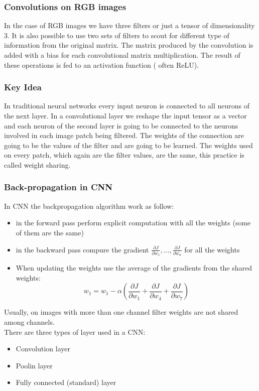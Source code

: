 \documentclass{article}
\begin{document}
\subsubsection{Convolutions on RGB images}
In the case of RGB images we have three filters or just a tensor of dimensionality 3. It is also possible to use two sets of filters to scout for different type of information from the original matrix. The matrix produced by the convolution is added with a bias for each convolutional matrix multiplication. The result of these operations is fed to an activation function ( often ReLU).
\subsubsection{Key Idea}
In traditional neural networks every input neuron is connected to all neurons of the next layer. In a convolutional layer we reshape the input tensor as a vector and each neuron of the second layer is going to be connected to the neurons involved in each image patch being filtered. The weights of the connection are going to be the values of the filter and are going to be learned. The weights used on every patch, which again are the filter values, are the same, this practice is called weight sharing. 
\subsubsection*{Back-propagation in CNN}
In CNN the backpropagation algorithm work as follow:
\begin{itemize}
    \item in the forward pass perform explicit computation with all the weights (some of them are the same)
    \item in the backward pass compure the gradient $\frac{\partial J}{\partial w_{1}}, \ldots,\frac{\partial J}{\partial w_{n}}$ for all the weights
    \item When updating the weights use the average of the gradients from the shared weights:
    \[ 
        w_1 = w_1-\alpha\left( \frac{\partial J}{\partial w_{1}}+\frac{\partial J}{\partial w_{4}}+\frac{\partial J}{\partial w_{7}}  \right)
    \]
\end{itemize}
Usually, on images with more than one channel filter weights are not shared among channels.\\
There are three types of layer used in a CNN:
\begin{itemize}
    \item Convolution layer
    \item Poolin layer
    \item Fully connected (standard) layer
\end{itemize}
\end{document}
